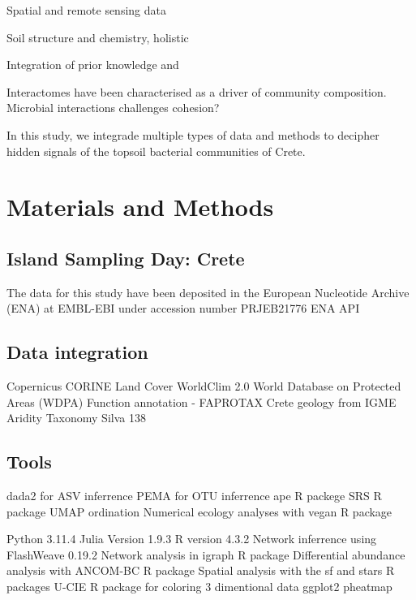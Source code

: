 \documentclass[unnumsec,webpdf,contemporary,large]{oup-authoring-template}%
\theoremstyle{thmstyleone}%
\theoremstyle{thmstyletwo}%
\theoremstyle{thmstylethree}%
\begin{document}
Spatial and remote sensing data

Soil structure and chemistry, holistic

Integration of prior knowledge and 


Interactomes have been characterised as a driver of community composition.
Microbial interactions challenges \cite{Faust2021} cohesion? 

In this study, we integrade multiple types of data and methods to decipher hidden 
signals of the topsoil bacterial communities of Crete. 


\section{Materials and Methods}\label{methods}


\subsection{Island Sampling Day: Crete}\label{isd_data}

The data for this study have been deposited in the European Nucleotide Archive (ENA) at EMBL-EBI under accession number PRJEB21776
ENA API \cite{Yuan2023}

\subsection{Data integration}\label{data}

Copernicus CORINE Land Cover \cite{CLC2023}
WorldClim 2.0 \cite{Fick2017}
World Database on Protected Areas (WDPA) \cite{Hanson2022}
Function annotation - FAPROTAX \cite{Louca2016}
Crete geology from IGME
Aridity
Taxonomy Silva 138 \cite{Quast2012}

\subsection{Tools}\label{tools}
dada2 for ASV inferrence \cite{Callahan2016}
PEMA for OTU inferrence \cite{Zafeiropoulos2020}
ape R packege \cite{Paradis2004}
SRS R package \cite{Beule2020}
UMAP ordination \cite{mcinnes2018umap-software}
Numerical ecology analyses with vegan R package \cite{vegan}

Python 3.11.4
Julia Version 1.9.3 \cite{Julia-2017}
R version 4.3.2 \cite{rcoreteam}
Network inferrence using FlashWeave 0.19.2 \cite{Tackmann2019}
Network analysis in igraph R package \cite{Csardi2006}
Differential abundance analysis with ANCOM-BC R package \cite{Lin2020,Lin2023}
Spatial analysis with the sf and stars R packages \cite{Pebesma2023}
U-CIE R package for coloring 3 dimentional data \cite{Koutrouli2022}
ggplot2 \cite{ggplot22016}
pheatmap \cite{Kolde2019}
\end{document}
